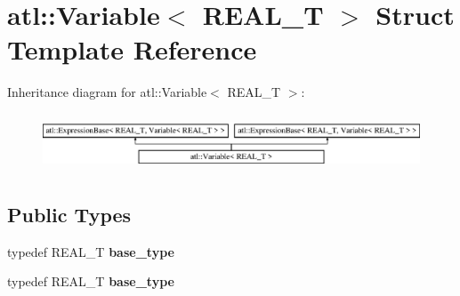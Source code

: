 \hypertarget{structatl_1_1_variable}{\section{atl\+:\+:Variable$<$ R\+E\+A\+L\+\_\+\+T $>$ Struct Template Reference}
\label{structatl_1_1_variable}
}
Inheritance diagram for atl\+:\+:Variable$<$ R\+E\+A\+L\+\_\+\+T $>$\+:\begin{figure}[H]
\begin{center}
\leavevmode
\includegraphics[height=1.717791cm]{structatl_1_1_variable}
\end{center}
\end{figure}
\subsection*{Public Types}
\begin{DoxyCompactItemize}
\item 
\hypertarget{structatl_1_1_variable_a1e4e292405873d1ddf28a7a629a11be4}{typedef R\+E\+A\+L\+\_\+\+T {\bfseries base\+\_\+type}}\label{structatl_1_1_variable_a1e4e292405873d1ddf28a7a629a11be4}

\item 
\hypertarget{structatl_1_1_variable_a1e4e292405873d1ddf28a7a629a11be4}{typedef R\+E\+A\+L\+\_\+\+T {\bfseries base\+\_\+type}}\label{structatl_1_1_variable_a1e4e292405873d1ddf28a7a629a11be4}

\end{DoxyCompactItemize}
